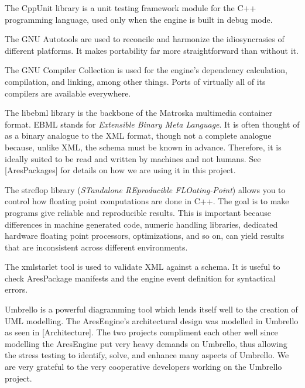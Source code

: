 
\startitemize[3]
\setupwhitespace[big]

The CppUnit library is a unit testing framework module for the C++ programming language, used only when the engine is built in debug mode.


The GNU Autotools are used to reconcile and harmonize the idiosyncrasies of different platforms. It makes portability far more straightforward than without it.


The GNU Compiler Collection is used for the engine's dependency calculation, compilation, and linking, among other things. Ports of virtually all of its compilers are available everywhere.


The libebml library is the backbone of the Matroska multimedia container format. EBML stands for {\it Extensible Binary Meta Language}. It is often thought of as a binary analogue to the XML format, though not a complete analogue because, unlike XML, the schema must be known in advance. Therefore, it is ideally suited to be read and written by machines and not humans. See [AresPackages] for details on how we are using it in this project.


The streflop library ({\it STandalone REproducible FLOating-Point}) allows you to control how floating point computations are done in C++. The goal is to make programs give reliable and reproducible results. This is important because differences in machine generated code, numeric handling libraries, dedicated hardware floating point processors, optimizations, and so on, can yield results that are inconsistent across different environments.


The xmlstarlet tool is used to validate XML against a schema. It is useful to check AresPackage manifests and the engine event definition for syntactical errors.


Umbrello is a powerful diagramming tool which lends itself well to the creation of UML modelling. The AresEngine's architectural design was modelled in Umbrello as seen in [Architecture]. The two projects compliment each other well since modelling the AresEngine put very heavy demands on Umbrello, thus allowing the stress testing to identify, solve, and enhance many aspects of Umbrello. We are very grateful to the very cooperative developers working on the Umbrello project.
\stopitemize


